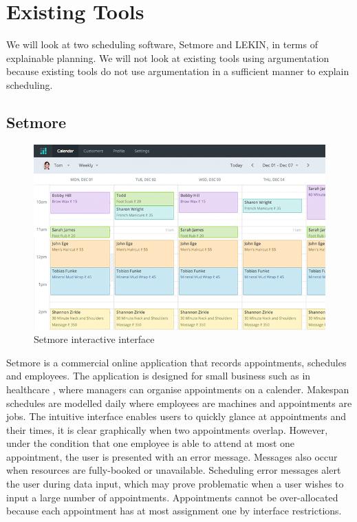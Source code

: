 \section{Existing Tools}

We will look at two scheduling software, Setmore and LEKIN, in terms of explainable planning. We will not look at existing tools using argumentation because existing tools do not use argumentation in a sufficient manner to explain scheduling.

\subsection{Setmore}

\begin{figure}[H]
	\begin{center}
		\includegraphics[width=\linewidth]{figures/setmore_gui.png}
	\end{center}
	\caption{Setmore interactive interface \cite{setmore}}
\end{figure}

Setmore is a commercial online application that records appointments, schedules and employees. The application is designed for small business such as in healthcare \cite{setmore}, where managers can organise appointments on a calender. Makespan schedules are modelled daily where employees are machines and appointments are jobs. The intuitive interface enables users to quickly glance at appointments and their times, it is clear graphically when two appointments overlap. However, under the condition that one employee is able to attend at most one appointment, the user is presented with an error message. Messages also occur when resources are fully-booked or unavailable. Scheduling error messages alert the user during data input, which may prove problematic when a user wishes to input a large number of appointments. Appointments cannot be over-allocated because each appointment has at most assignment one by interface restrictions.

